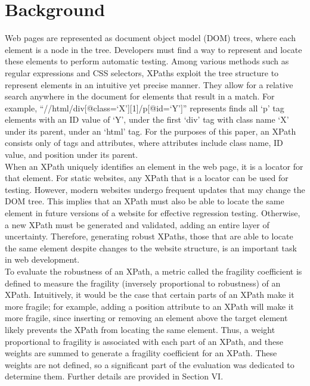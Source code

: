 \documentclass[format=acmlarge, nonacm=true]{acmart}
\begin{document}
\section{Background}
Web pages are represented as document object model (DOM) trees, where each element is a node in the tree. Developers must find a way to represent and locate these elements to perform automatic testing. Among various methods such as regular expressions and CSS selectors, XPaths exploit the tree structure to represent elements in an intuitive yet precise manner. They allow for a relative search anywhere in the document for elements that result in a match. For example, “//html/div[@class=‘X’][1]/p[@id=‘Y’]” represents finds all ‘p’ tag elements with an ID value of ‘Y’, under the first ‘div’ tag with class name ‘X’ under its parent, under an ‘html’ tag.  For the purposes of this paper, an XPath consists only of tags and attributes, where attributes include class name, ID value, and position under its parent.\\

When an XPath uniquely identifies an element in the web page, it is a locator for that element. For static websites, any XPath that is a locator can be used for testing. However, modern websites undergo frequent updates that may change the DOM tree. This implies that an XPath must also be able to locate the same element in future versions of a website for effective regression testing. Otherwise, a new XPath must be generated and validated, adding an entire layer of uncertainty. Therefore, generating robust XPaths, those that are able to locate the same element despite changes to the website structure, is an important task in web development.\\

To evaluate the robustness of an XPath, a metric called the fragility coefficient is defined to measure the fragility (inversely proportional to robustness) of an XPath. Intuitively, it would be the case that certain parts of an XPath make it more fragile; for example, adding a position attribute to an XPath will make it more fragile, since inserting or removing an element above the target element likely prevents the XPath from locating the same element. Thus, a weight proportional to fragility is associated with each part of an XPath, and these weights are summed to generate a fragility coefficient for an XPath. These weights are not defined, so a significant part of the evaluation was dedicated to determine them. Further details are provided in Section VI.\\
\end{document}
